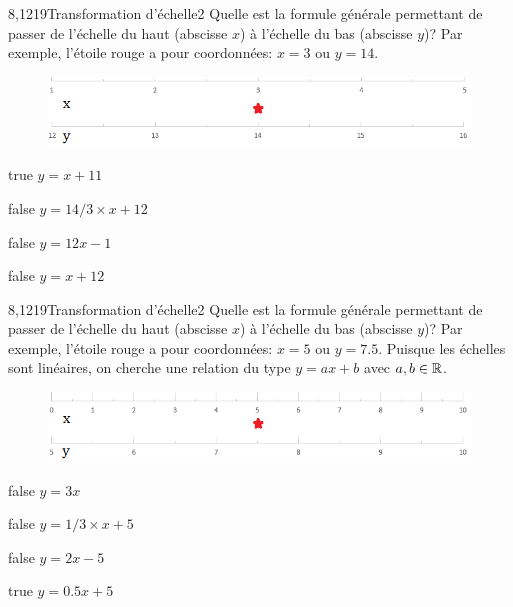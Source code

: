			\begin{question}{8,1219}{Transformation d'échelle}{2}{}
				Quelle est la formule générale permettant de passer de l'échelle du haut (abscisse $x$) à l'échelle du bas (abscisse $y$)? Par exemple, l'étoile rouge a pour coordonnées: $x=3$ ou $y=\num{14}$.
				\begin{figure}
					\centering
					\includegraphics[scale=.75]{Antoine/Figures_Antoine/lin_1_5_to_lin_12_16_star_3_14.png}
				\end{figure}
			\end{question}
			\begin{reponses}
				\item[true] $y = x + 11$
				\item[false] $y = 14/3\times x+12$
				\item[false] $y = 12x-1$
				\item[false] $y = x + 12$
			\end{reponses}
			\begin{question}{8,1219}{Transformation d'échelle}{2}{}
				Quelle est la formule générale permettant de passer de l'échelle du haut (abscisse $x$) à l'échelle du bas (abscisse $y$)? Par exemple, l'étoile rouge a pour coordonnées: $x=5$ ou $y=\num{7.5}$. Puisque les échelles sont linéaires, on cherche une relation du type $y = ax+b$ avec $a,b\in\mathbb {R} $.
				\begin{figure}
					\centering
					\includegraphics[scale=.75]{Antoine/Figures_Antoine/lin_0_10_to_lin_5_10_star_5_7d5.png}
				\end{figure}
			\end{question}
			\begin{reponses}
				\item[false] $y = 3x$
					\item[false] $y = 1/3\times x+5$
					\item[false] $y = 2 x-5$
					\item[true] $y = \num{0.5}x + 5$
			\end{reponses}
